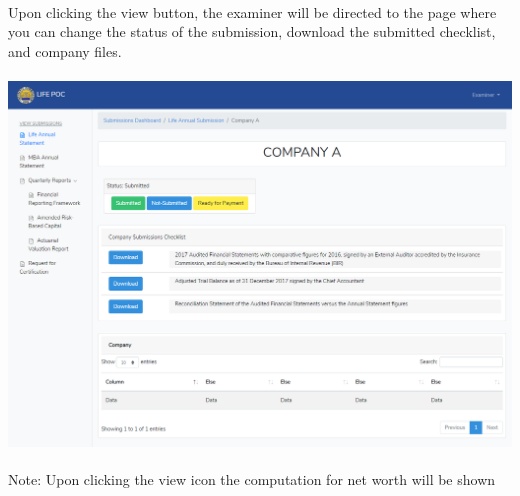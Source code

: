\documentclass{article}
\begin{document}
\paragraph{ }\label{sec--}%

\paragraph{ }\label{sec--}%

\paragraph{ }\label{sec--}%

\paragraph{ }\label{sec--}%

\noindent{}Upon clicking the view button, the examiner will be
directed to the page where you can change the status of the submission,
download the submitted checklist, and company files.%

\paragraph{\includegraphics[keepaspectratio=true]{up-ic-screens/image129}{}}\label{sec-up-ic-screensimage129png}%

\noindent{}Note: Upon clicking the view icon the computation for
net worth will be shown%
\end{document}
